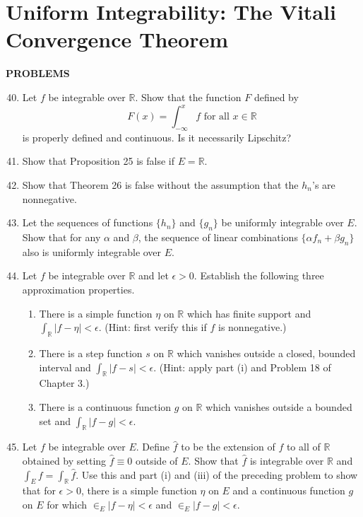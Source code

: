 \section{Uniform Integrability: The Vitali Convergence Theorem}
\begin{center}
	\textbf{PROBLEMS}
\end{center}
\begin{enumerate}
	\setcounter{enumi}{39}
    \item Let $f$ be integrable over $\mathbb{R}$. Show that the function $F$ defined by 
    \[
        F(x) = \int_{-\infty}^xf\text{ for all }x\in\mathbb{R}
    \]
    is properly defined and continuous. Is it necessarily Lipschitz?
    \item Show that Proposition 25 is false if $E=\mathbb{R}$.
    \item Show that Theorem 26 is false without the assumption that the $h_n$'s are nonnegative.
    \item Let the sequences of functions $\{h_n\}$ and $\{g_n\}$ be uniformly integrable over $E$. Show that for any $\alpha$ and $\beta$, the sequence of linear combinations $\{\alpha f_n + \beta g_n\}$ also is uniformly integrable over $E$.
    \item Let $f$ be integrable over $\mathbb{R}$ and let $\epsilon>0$. Establish the following three approximation properties. 
    \begin{enumerate}[label=(\roman*),align=left]
        \item There is a simple function $\eta$ on $\mathbb{R}$ which has finite support and $\int_{\mathbb{R}}|f-\eta|<\epsilon$. (Hint: first verify this if $f$ is nonnegative.)
        \item There is a step function $s$ on $\mathbb{R}$ which vanishes outside a closed, bounded interval and $\int_{\mathbb{R}}|f-s|<\epsilon$. (Hint: apply part (i) and Problem 18 of Chapter 3.)
        \item There is a continuous function $g$ on $\mathbb{R}$ which vanishes outside a bounded set and $\int_{\mathbb{R}}|f-g|<\epsilon$.
    \end{enumerate}
    \item Let $f$ be integrable over $E$. Define $\hat f$ to be the extension of $f$ to all of $\mathbb{R}$ obtained by setting $\hat f \equiv 0$ outside of $E$. 
    Show that $\hat f$ is integrable over $\mathbb{R}$ and $\int_Ef=\int_{\mathbb{R}}\hat f$.
    Use this and part (i) and (iii) of the preceding problem to show that for $\epsilon>0$, there is a simple function $\eta$ on $E$ and a continuous function $g$ on $E$ for which $\in_E|f-\eta|<\epsilon$ and $\in_E|f-g|<\epsilon$.

\end{enumerate}
